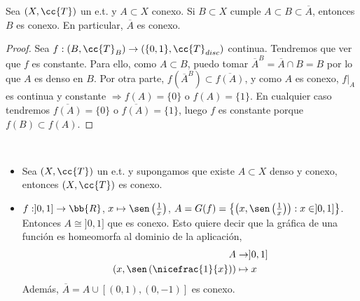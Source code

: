 \begin{prop}
    Sea $(X, \cc{T})$ un e.t. y $A\subset X$ conexo. Si $B\subset X$ cumple $A\subset B \subset \overline{A}$, entonces $B$ es conexo. En particular, $\overline{A}$ es conexo.
    \begin{proof}
        Sea $f:(B, \cc{T}_B)\to (\{0,1\}, \cc{T}_{disc})$ continua. Tendremos que ver que $f$ es constante. Para ello, como $A\subset B$, puedo tomar $\overline{A}^B=\overline{A}\cap B = B$ por lo que $A$ es denso en $B$. Por otra parte, $f(\overline{A}^B)\subset \overline{f(A)}$, y como $A$ es conexo, $f|_A$ es continua y constante $\Rightarrow f(A)=\{0\}$ o $f(A)=\{1\}$. En cualquier caso tendremos $\overline{f(A)}=\{0\}$ o $\overline{f(A)}=\{1\}$, luego $f$ es constante porque $f(B)\subset f(A)$.

    \end{proof}
\end{prop}

\begin{ejemplo}\
    \begin{itemize}
        \item Sea $(X, \cc{T})$ un e.t. y supongamos que existe $A\subset X$ denso y conexo, entonces $(X, \cc{T})$ es conexo.
        \item $f:]0,1] \to \bb{R}$, $x\mapsto \sen\left(\frac{1}{x}\right)$, $A=G(f)=\left\{\left(x, \sen\left(\frac{1}{x}\right)\right): x\in ]0,1]\right\}$. Entonces $A\cong ]0,1]$ que es conexo. Esto quiere decir que la gráfica de una función es homeomorfa al dominio de la aplicación,
        \begin{align*}
            A & \to ]0,1]\\
            \left(x, \sen\left(\nicefrac{1}{x}\right)\right) & \mapsto x
        \end{align*}
        Además, $\overline{A}=A\cup[(0,1),(0,-1)]$ es conexo.
    \end{itemize}
    \endsquare
\end{ejemplo}

